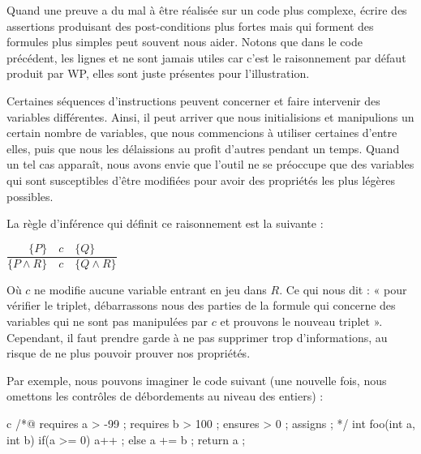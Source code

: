 \documentclass[middle]{zmdocument}
\begin{document}
Quand une preuve a du mal à être réalisée sur un code plus complexe, écrire des
assertions produisant des post-conditions plus fortes mais qui forment des formules
plus simples peut souvent nous aider. Notons que dans le code précédent, les lignes
 et  ne sont jamais utiles car c'est le raisonnement par
défaut produit par WP, elles sont juste présentes pour l'illustration.





Certaines séquences d'instructions peuvent concerner et faire intervenir des 
variables différentes. Ainsi, il peut arriver que nous initialisions et manipulions
un certain nombre de variables, que nous commencions à utiliser certaines d'entre 
elles, puis que nous les délaissions au profit d'autres pendant un temps. Quand un
tel cas apparaît, nous avons envie que l'outil ne se préoccupe que des variables 
qui sont susceptibles d'être modifiées pour avoir des propriétés les plus légères 
possibles.



La règle d'inférence qui définit ce raisonnement est la suivante :




\begin{center}
$\dfrac{\{P\}\quad c\quad \{Q\}}{\{P \wedge R\}\quad c\quad \{Q \wedge R\}}$


\end{center}


Où $c$ ne modifie aucune variable entrant en jeu dans $R$. Ce qui nous dit : « pour 
vérifier le triplet, débarrassons nous des parties de la formule qui concerne des
variables qui ne sont pas manipulées par $c$ et prouvons le nouveau triplet ». 
Cependant, il faut prendre garde à ne pas supprimer trop d'informations, au risque
de ne plus pouvoir prouver nos propriétés.



Par exemple, nous pouvons imaginer le code suivant (une nouvelle fois, nous omettons
les contrôles de débordements au niveau des entiers) :



\begin{CodeBlock}{c}
/*@
  requires a > -99 ;
  requires b > 100 ;
  ensures  \result > 0 ;
  assigns  \nothing ;
*/
int foo(int a, int b){
  if(a >= 0){
    a++ ;
  } else {
    a += b ;
  }
  return a ;
}
\end{CodeBlock}
\end{document}
